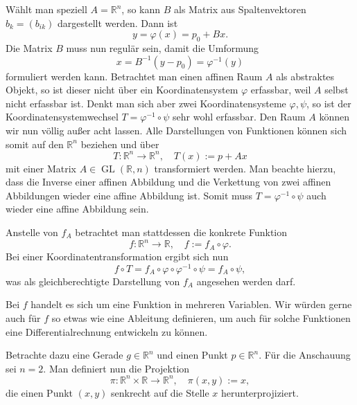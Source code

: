 \documentclass[a4paper,11pt,fleqn,twoside]{scrartcl}
\numberwithin{equation}{section}
\newcommand{\R}{\mathbb R}
\theoremstyle{rmbox}
\begin{document}
Wählt man speziell $A=\R^n$, so kann $B$ als Matrix aus
Spaltenvektoren $b_k=(b_{ik})$ dargestellt werden. Dann ist
\begin{equation}
y = \varphi(x) = p_0+Bx.
\end{equation}
Die Matrix $B$ muss nun regulär sein, damit die Umformung
\begin{equation}
x = B^{-1}(y-p_0) = \varphi^{-1}(y)
\end{equation}
formuliert werden kann. Betrachtet man einen affinen Raum $A$ als
abstraktes Objekt, so ist dieser nicht über ein Koordinatensystem
$\varphi$ erfassbar, weil $A$ selbst nicht erfassbar ist. Denkt
man sich aber zwei Koordinatensysteme $\varphi,\psi$, so ist
der Koordinatensystemwechsel $T=\varphi^{-1}\circ\psi$ sehr
wohl erfassbar. Den Raum $A$ können wir nun völlig außer acht lassen.
Alle Darstellungen von Funktionen können sich somit auf
den $\R^n$ beziehen und über
\begin{equation}
T\colon\R^n\to\R^n,\quad T(x) := p+Ax
\end{equation}
mit einer Matrix $A\in\operatorname{GL}(\R,n)$ transformiert werden.
Man beachte
hierzu, dass die Inverse einer affinen Abbildung und die Verkettung
von zwei affinen Abbildungen wieder eine affine Abbildung ist. Somit
muss $T=\varphi^{-1}\circ\psi$ auch wieder eine affine Abbildung
sein.

Anstelle von $f_A$ betrachtet man stattdessen
die konkrete Funktion
\begin{equation}
f\colon\R^n\to\R,\quad f := f_A\circ\varphi.
\end{equation}
Bei einer Koordinatentransformation ergibt sich nun
\begin{equation}
f\circ T = f_A\circ\varphi\circ\varphi^{-1}\circ\psi
= f_A\circ\psi,
\end{equation}
was als gleichberechtigte Darstellung von $f_A$ angesehen werden
darf.

Bei $f$ handelt es sich um eine Funktion in mehreren Variablen.
Wir würden gerne auch für $f$ so etwas wie eine Ableitung definieren,
um auch für solche Funktionen eine Differentialrechnung entwickeln
zu können.

Betrachte dazu eine Gerade $g\in\R^n$ und einen Punkt $p\in\R^n$.
Für die Anschauung sei $n=2$. Man definiert nun die Projektion
\begin{equation}
\pi\colon\R^n\times\R\to\R^n,\quad \pi(x,y):=x,
\end{equation}
die einen Punkt $(x,y)$ senkrecht auf die Stelle $x$
herunterprojiziert.
\end{document}
